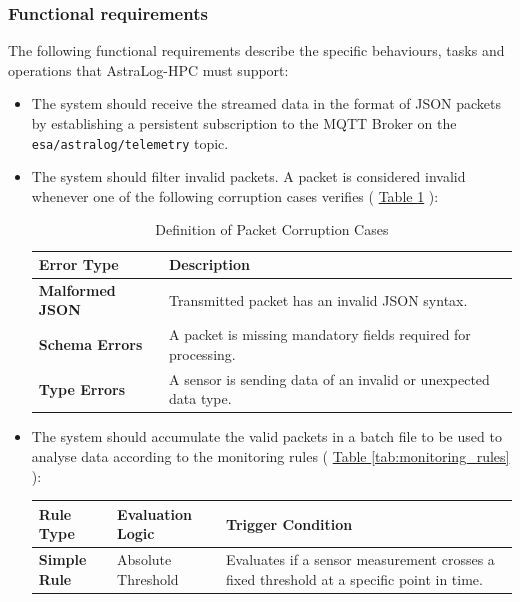 \documentclass{article}
\newcommand{\tablerefer}[1]{%
    \hyperref[#1_top]{Table \ref*{#1}}%
}
\begin{document}
\subsubsection{Functional requirements}
The following functional requirements describe the specific behaviours, tasks and operations that AstraLog-HPC must support:
\begin{itemize}
    \item The system should receive the streamed data in the format of JSON packets by establishing a persistent subscription to the MQTT Broker on the \verb|esa/astralog/telemetry| topic.
    \item The system should filter invalid packets. A packet is considered invalid whenever one of the following corruption cases verifies (\tablerefer{tab:corruption_cases}):
    \begin{table}[h!]
    \label{tab:corruption_cases_top}
    \centering
    \begin{tabularx}{\textwidth}{|l|X|}
    \hline
    \textbf{Error Type} & \textbf{Description} \\ \hline
    \textbf{Malformed JSON} & Transmitted packet has an invalid JSON syntax. \\ \hline
    \textbf{Schema Errors} & A packet is missing mandatory fields required for processing. \\ \hline
    \textbf{Type Errors} & A sensor is sending data of an invalid or unexpected data type. \\ \hline
    \end{tabularx}
    \caption{Definition of Packet Corruption Cases}
    \label{tab:corruption_cases}
    \end{table}
    \item The system should accumulate the valid packets in a batch file to be used to analyse data according to the monitoring rules
    (\tablerefer{tab:monitoring_rules}):
    \begin{table}[!h]
    \label{tab:monitoring_rules_top}
    \centering
    \begin{tabularx}{\textwidth}{|l|l|X|}
    \hline
    \textbf{Rule Type} & \textbf{Evaluation Logic} & \textbf{Trigger Condition} \\ \hline
    \textbf{Simple Rule} & Absolute Threshold & Evaluates if a sensor measurement crosses a fixed threshold at a specific point in time. \\ \hline

\end{tabularx}
\end{table}
\end{itemize}
\end{document}
